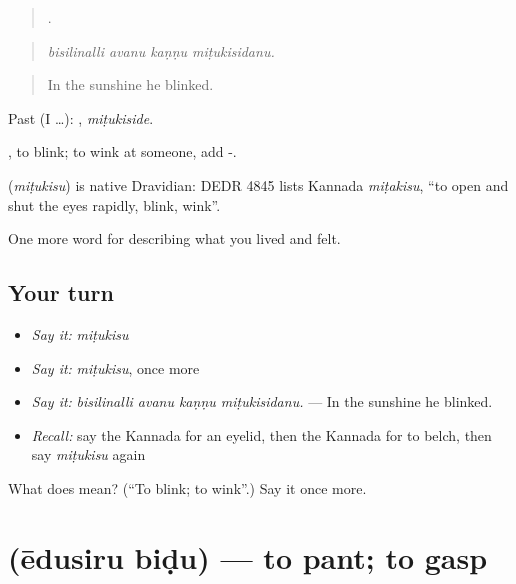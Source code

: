 \begin{quote}
   .
\end{quote}

\begin{quote}
\emph{bisilinalli avanu kaṇṇu miṭukisidanu.}
\end{quote}

\begin{quote}
In the sunshine he blinked.
\end{quote}

Past (I …): , \emph{miṭukiside}.

 , to blink; to wink at someone, add -.

\begin{cousinweb}
\textbf{} (\emph{miṭukisu}) is native Dravidian: DEDR 4845 lists Kannada \emph{miṭakisu}, \textquotedblleft{}to open and shut the eyes rapidly, blink, wink\textquotedblright{}.
\end{cousinweb}

\begin{grammarlens}[title={What you've built}]
One more word for describing what you lived and felt.
\end{grammarlens}

\subsection*{Your turn}
\begin{itemize}
\raggedright
  \item \emph{Say it:} \emph{miṭukisu}
  \item \emph{Say it:} \emph{miṭukisu}, once more
  \item \emph{Say it:} \emph{bisilinalli avanu kaṇṇu miṭukisidanu.} — In the sunshine he blinked.
  \item \emph{Recall:} say the Kannada for an eyelid, then the Kannada for to belch, then say \emph{miṭukisu} again
\end{itemize}

\begin{tcolorbox}[breakable,colback=teal!4,colframe=teal!35!black,title={Before you move on}]
What does  mean? (\textquotedblleft{}To blink; to wink\textquotedblright{}.) Say it once more.
\end{tcolorbox}
\section[\texorpdfstring{\kn{ಏದುಸಿರು} \kn{ಬಿಡು} (ēdusiru biḍu)}{ಏದುಸಿರು ಬಿಡು (ēdusiru biḍu)}]{  (ēdusiru biḍu) — to pant; to gasp}

